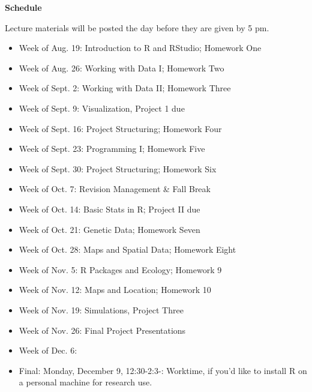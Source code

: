 \documentclass[12pt]{article}
\let\oldtextbf\textbf
\renewcommand{\textbf}[1]{\textcolor{coolblack}{\oldtextbf{#1}}}
\begin{document}
\begin{flushleft}
\textbf{Schedule}
\end{flushleft}

Lecture materials will be posted the day before they are given by 5 pm.

\begin{itemize}
\item Week of Aug. 19: Introduction to R and RStudio; Homework One
\item Week of Aug. 26:  Working with Data I; Homework Two
\item Week of Sept. 2: Working with Data II; Homework Three
\item Week of Sept. 9: Visualization, Project 1 due
\item Week of Sept. 16: Project Structuring; Homework Four
\item Week of Sept. 23: Programming I; Homework Five
\item Week of Sept. 30:  Project Structuring; Homework Six
\item Week of Oct. 7: Revision Management \& Fall Break
\item Week of Oct. 14:  Basic Stats in R; Project II due
\item Week of Oct. 21: Genetic Data; Homework Seven
\item Week of Oct. 28:  Maps and Spatial Data; Homework Eight
\item Week of Nov. 5: R Packages and Ecology; Homework 9
\item Week of Nov. 12:  Maps and Location; Homework 10
\item Week of Nov. 19: Simulations, Project Three
\item Week of Nov. 26: Final Project Presentations
\item Week of Dec. 6:
\item Final:
   Monday, December 9, 12:30-2:3-: Worktime, if you'd like to install R on a personal machine for research use.


\end{itemize}
\end{document}

